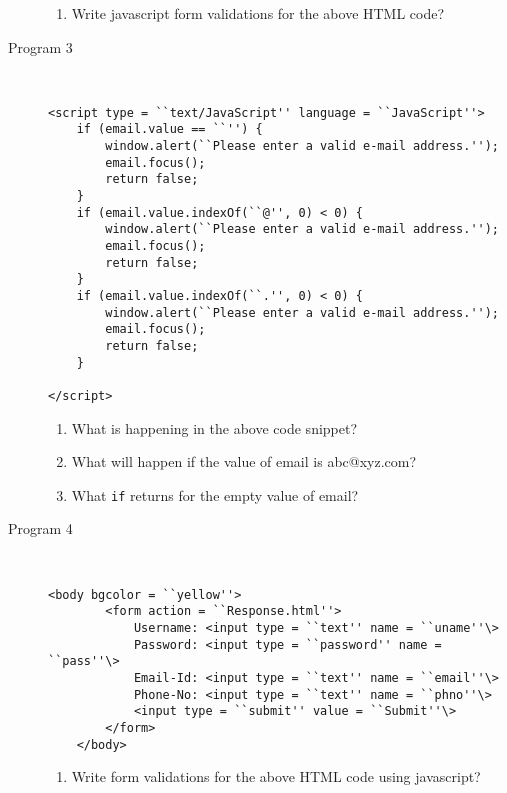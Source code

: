 \documentclass[11pt,a4paper]{article}
\def\AnswerBox{\fbox{\begin{minipage}{4in}\hfill\vspace{0.5in}\end{minipage}}}
\begin{document}
\begin{description}
\AnswerBox

\begin{enumerate}[label=\bfseries Q\arabic*:]\itemsep10pt
\item Write javascript form validations for the above HTML code?
\end{enumerate}
\item [Program 3]\ 
\begin{lstlisting}
<script type = ``text/JavaScript'' language = ``JavaScript''>
    if (email.value == ``'') {
        window.alert(``Please enter a valid e-mail address.'');
        email.focus();
        return false;
    }
    if (email.value.indexOf(``@'', 0) < 0) {
        window.alert(``Please enter a valid e-mail address.'');
        email.focus();
        return false;
    }
    if (email.value.indexOf(``.'', 0) < 0) {
        window.alert(``Please enter a valid e-mail address.'');
        email.focus();
        return false;
    }

</script>
\end{lstlisting}
\AnswerBox

\begin{enumerate}[label=\bfseries Q\arabic*:]\itemsep10pt
\item What is happening in the above code snippet?
\item What will happen if the value of email is abc@xyz.com?
\item What \texttt{if} returns for the empty value of email? 
\end{enumerate}
\item [Program 4]\
\begin{lstlisting}
<body bgcolor = ``yellow''>
        <form action = ``Response.html''>
            Username: <input type = ``text'' name = ``uname''\>
            Password: <input type = ``password'' name = ``pass''\>
            Email-Id: <input type = ``text'' name = ``email''\>
            Phone-No: <input type = ``text'' name = ``phno''\>
            <input type = ``submit'' value = ``Submit''\>
        </form> 
    </body>
\end{lstlisting}
\AnswerBox

\begin{enumerate}[label=\bfseries Q\arabic*:]\itemsep10pt
\item Write form validations for the above HTML code using javascript?
\end{enumerate}
\end{description}
\end{document}
